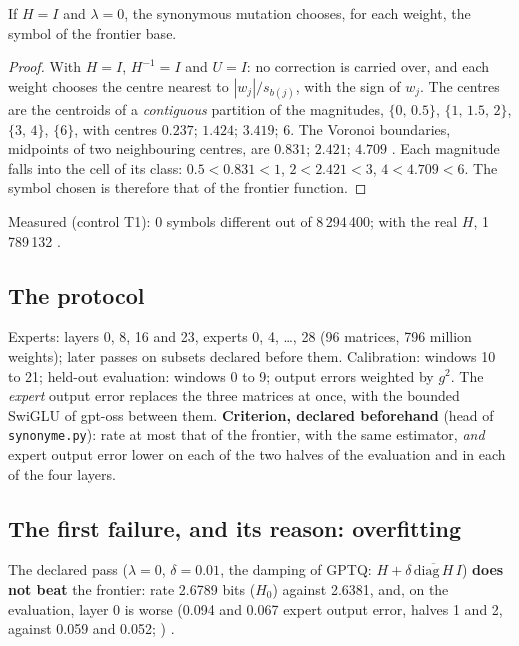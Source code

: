 \begin{proposition}[The control that can fail: $H = I$ reproduces the frontier]\label{t3ecl:prop:temoin}
If $H = I$ and $\lambda = 0$, the synonymous mutation chooses, for each weight, the symbol of the frontier base.
\end{proposition}

\begin{proof}
With $H = I$, $H^{-1} = I$ and $U = I$: no correction is carried over, and each weight chooses the centre nearest to $|w_j|/s_{b(j)}$, with the sign of $w_j$. The centres are the centroids of a \emph{contiguous} partition of the magnitudes, $\{0,\,0.5\}$, $\{1,\,1.5,\,2\}$, $\{3,\,4\}$, $\{6\}$, with centres $0.237$; $1.424$; $3.419$; $6$. The Voronoi boundaries, midpoints of two neighbouring centres, are $0.831$; $2.421$; $4.709$ \calc. Each magnitude falls into the cell of its class: $0.5 < 0.831 < 1$, $2 < 2.421 < 3$, $4 < 4.709 < 6$. The symbol chosen is therefore that of the frontier function.
\end{proof}

Measured (control T1): 0 symbols different out of 8\,294\,400; with the real $H$, 1\,789\,132 \mes.

\subsection{The protocol}

Experts: layers 0, 8, 16 and 23, experts 0, 4, \ldots, 28 (96 matrices, 796 million weights); later passes on subsets declared before them. Calibration: windows 10 to 21; held-out evaluation: windows 0 to 9; output errors weighted by $g^2$. The \emph{expert} output error replaces the three matrices at once, with the bounded SwiGLU of gpt-oss between them. \textbf{Criterion, declared beforehand} (head of \texttt{synonyme.py}): rate at most that of the frontier, with the same estimator, \emph{and} expert output error lower on each of the two halves of the evaluation and in each of the four layers.

\subsection{The first failure, and its reason: overfitting}

The declared pass ($\lambda = 0$, $\delta = 0.01$, the damping of GPTQ: $H + \delta\,\overline{\mathrm{diag}\,H}\, I$) \textbf{does not beat} the frontier: rate 2.6789 bits ($H_0$) against 2.6381, and, on the evaluation, layer 0 is worse (0.094 and 0.067 expert output error, halves 1 and 2, against 0.059 and 0.052; ) \mes.

